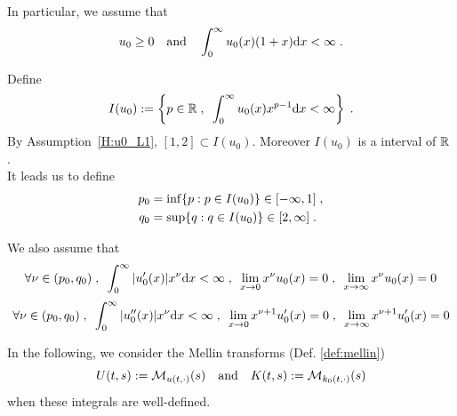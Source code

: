 \documentclass[11pt]{amsart}
\begin{document}
In particular, we assume that 
    \begin{equation}
        u_0 \geq 0 \quad \text{and} \quad \int_0^\infty u_0(x) (1+x) \mathrm dx < \infty
        \; .
        \label{H:u0_L1}
    \end{equation}
    
Define 
    \begin{equation}
        I(u_0) := \left\{ p \in \mathbb{R} \; , \enspace \int_0^\infty u_0(x) x^{p-1} \mathrm dx < \infty \right\}
        \; .
    \end{equation}
By Assumption~\eqref{H:u0_L1}, $[1, 2] \subset I(u_0)$. Moreover $I(u_0)$ is a interval of $\mathbb{R}$ . \\
It leads us to define
    \begin{subequations}
    \begin{align*}
        p_0 &= \inf \{p : p \in I(u_0) \} \in [-\infty, 1] \; ,\\
        q_0 &= \sup \{q : q \in I(u_0) \} \in [2, \infty] \; .
    \end{align*}    
    \end{subequations}
    
We also assume that 
    \begin{equation}
        \forall \nu \in (p_0, q_0) 
        \; , \enspace
        \int_0^\infty |u_0'(x)| x^\nu \mathrm dx < \infty
        \; , \enspace
        \lim_{x \to 0} x^\nu u_0(x) = 0
        \; , \enspace
        \lim_{x \to \infty} x^\nu u_0(x) = 0
        \label{H:DoumicEsco22}
    \end{equation}
    \begin{equation}
        \forall \nu \in (p_0, q_0) 
        \; , \enspace
        \int_0^\infty |u_0''(x)| x^\nu \mathrm dx < \infty
        \; , \enspace
        \lim_{x \to 0} x^{\nu + 1} u_0'(x) = 0
        \; , \enspace
        \lim_{x \to \infty} x^{\nu + 1} u_0'(x) = 0
        \label{H:DoumicEsco23}
    \end{equation}
    
In the following, we consider the Mellin transforms (Def. \ref{def:mellin})
    \begin{equation*}
        U(t,s) := \mathcal{M}_{u(t, \cdot)}(s)
        \quad \text{and} \quad
        K(t,s) := \mathcal{M}_{k_0(t, \cdot)}(s)
    \end{equation*}
when these integrals are well-defined.
\end{document}
